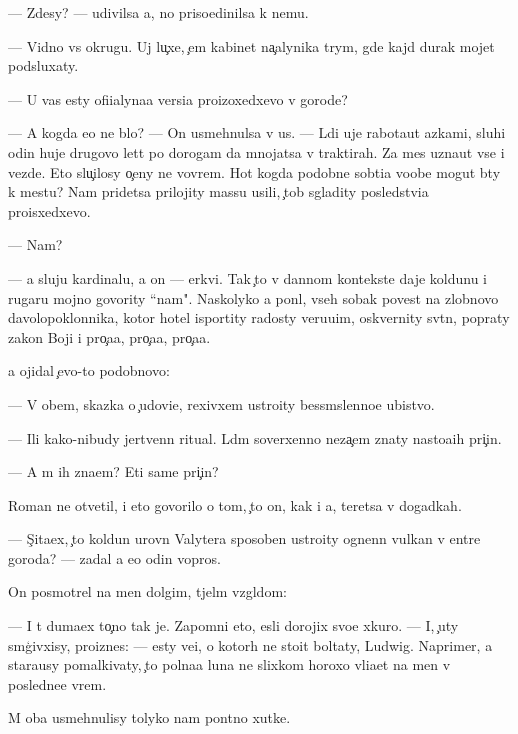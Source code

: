 \documentclass[10pt]{book}
\begin{document}
— Zdesy? — udivilsa {\y}a, no priso{\y}edinilsa k nemu.

— Vidno vs{\iu} okrugu. Uj lu{\c}xe, {\c}em kabinet na{\c}alynika t{\iu}rym{\yi}, gde kajd{\yi}{\y} durak mojet podsluxaty.

— U vas {\y}esty ofi{\q}ialyna{\y}a versi{\y}a proizoxedxevo v gorode?

— A kogda {\y}e{\y}o ne b{\yi}lo? — On usmehnulsa v us{\yi}. — L{\iu}di uje rabota{\y}ut {\y}az{\yi}kami, sluhi odin huje drugovo let{\ia}t po dorogam da mnojatsa v traktirah. Za mes{\ia}{\q} uzna{\y}ut vse i vezde. Eto slu{\c}ilosy o{\c}eny ne vovrem{\ia}. Hot{\ia} kogda podobn{\yi}{\y}e sob{\yi}ti{\y}a voob{\x}e mogut b{\yi}ty k mestu? Nam pridetsa prilojity massu usili{\y}, {\c}tob{\yi} sgladity posledstvi{\y}a proisxedxevo.

— Nam?

— {\Y}a sluju kardinalu, a on — {\Q}erkvi. Tak {\c}to v dannom kontekste daje koldunu i rugaru mojno govority ``nam". Naskolyko {\y}a pon{\ia}l, vseh sobak poves{\ia}t na zlobnovo d{\y}avolopoklonnika, kotor{\yi}{\y} hotel isportity radosty veru{\y}u{\x}im, oskvernity sv{\ia}t{\yi}n{\iu}, popraty zakon{\yi} Boj{\yf}i i pro{\c}a{\y}a, pro{\c}a{\y}a, pro{\c}a{\y}a.

{\Y}a ojidal {\c}evo-to podobnovo:

— V ob{\x}em, skazka o {\c}udovi{\x}e, rexivxem ustro{\y}ity bessm{\yi}slenno{\y}e ubi{\y}stvo.

— Ili kako{\y}-nibudy jertvenn{\yi}{\y} ritual. L{\iu}d{\ia}m soverxenno neza{\c}em znaty nasto{\y}a{\x}ih pri{\c}in.

— A m{\yi} ih zna{\y}em? Eti sam{\yi}{\y}e pri{\c}in{\yi}?

Roman ne otvetil, i eto govorilo o tom, {\c}to on, kak i {\y}a, ter{\ia}{\y}etsa v dogadkah.

— S{\c}ita{\y}ex, {\c}to koldun urovn{\ia} Valytera sposoben ustro{\y}ity ognenn{\yi}{\y} vulkan v {\q}entre goroda? — zadal {\y}a {\y}e{\x}o odin vopros.

On posmotrel na men{\ia} dolgim, t{\ia}jel{\yi}m vzgl{\ia}dom:

— I t{\yi} duma{\y}ex to{\c}no tak je. Zapomni eto, {\y}esli dorojix svo{\y}e{\y} xkuro{\y}. — I, {\c}uty sm{\ia}g{\c}ivxisy, proiznes: — {\Y}esty ve{\x}i, o kotor{\yi}h ne sto{\y}it boltaty, Ludwig. Naprimer, {\y}a stara{\y}usy pomalkivaty, {\c}to polna{\y}a luna ne slixkom horoxo vli{\y}a{\y}et na men{\ia} v posledne{\y}e vrem{\ia}.

M{\yi} oba usmehnulisy tolyko nam pon{\ia}tno{\y} xutke.
\end{document}
